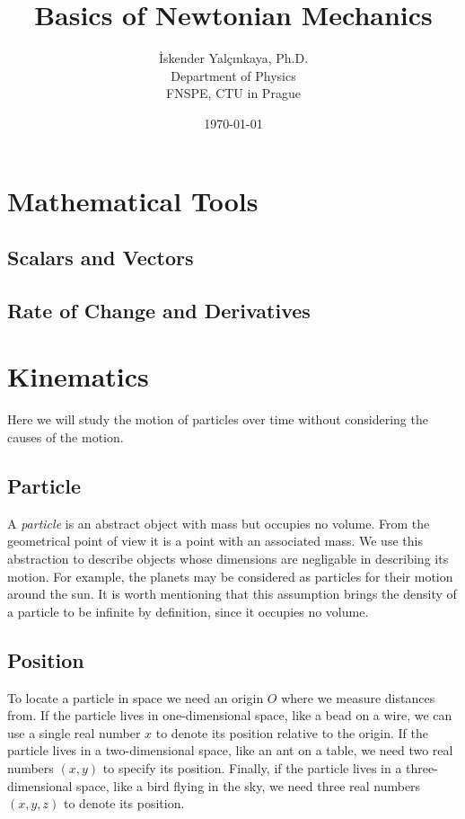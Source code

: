 \documentclass[12pt,oneside]{book}
\title{Basics of Newtonian Mechanics}
\author{İskender Yalçınkaya, Ph.D. \\
        \small{Department of Physics} \\
        \small{FNSPE, CTU in Prague}}
\date{\today}
\numberwithin{equation}{chapter}
\begin{document}
\frontmatter
\maketitle
\tableofcontents

\mainmatter

\chapter{Mathematical Tools}
\section{Scalars and Vectors}
\section{Rate of Change and Derivatives}
\chapter{Kinematics}
Here we will study the motion of particles over time without considering the causes of the motion.

\section{Particle}

A \emph{particle} is an abstract object with mass but occupies no volume. From the geometrical point of view it is a point with an associated mass. We use this abstraction to describe objects whose dimensions are negligable in describing its motion. For example, the planets may be considered as particles for their motion around the sun. It is worth mentioning that this assumption brings the density of a particle to be infinite by definition, since it occupies no volume.

\section{Position}
To locate a particle in space we need an origin $O$ where we measure distances from. If the particle lives in one-dimensional space, like a bead on a wire, we can use a single real number $x$ to denote its position relative to the origin. If the particle lives in a two-dimensional space, like an ant on a table, we need two real numbers $(x,y)$ to specify its position. Finally, if the particle lives in a three-dimensional space, like a bird flying in the sky, we need three real numbers $(x,y,z)$ to denote its position.
\end{document}

